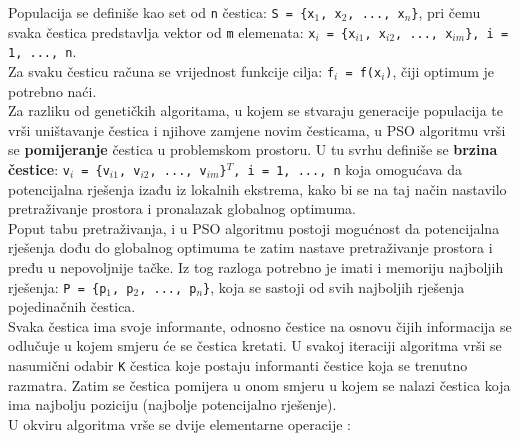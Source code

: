 \documentclass[12pt, a4paper]{article}
\begin{document}
Populacija se definiše kao set od \texttt{n} čestica: \texttt{S = \{x$_1$, x$_2$, ..., x$_n$\}}, pri čemu svaka čestica predstavlja vektor od \texttt{m} elemenata: \texttt{x$_i$ = \{x$_{i1}$, x$_{i2}$, ..., x$_{im}$\}, i = 1, ..., n}.\\

Za svaku česticu računa se vrijednost funkcije cilja: \texttt{f$_i$ = f(x$_i$)}, čiji optimum je potrebno naći.\\

Za razliku od genetičkih algoritama, u kojem se stvaraju generacije populacija te vrši uništavanje čestica i njihove zamjene novim česticama, u PSO algoritmu vrši se \textbf{pomijeranje} čestica u problemskom prostoru. U tu svrhu definiše se \textbf{brzina čestice}: \texttt{v$_i$ = \{v$_{i1}$, v$_{i2}$, ..., v$_{im}$\}$^T$, i = 1, ..., n} koja omogućava da potencijalna rješenja izađu iz lokalnih ekstrema, kako bi se na taj način nastavilo pretraživanje prostora i pronalazak globalnog optimuma. \cite{pso} \\

Poput tabu pretraživanja, i u PSO algoritmu postoji mogućnost da potencijalna rješenja dođu do globalnog optimuma te zatim nastave pretraživanje prostora i pređu u nepovoljnije tačke. Iz tog razloga potrebno je imati i memoriju najboljih rješenja: \texttt{P = \{p$_1$, p$_2$, ..., p$_n$\}}, koja se sastoji od svih najboljih rješenja pojedinačnih čestica. \\

Svaka čestica ima svoje informante, odnosno čestice na osnovu čijih informacija se odlučuje u kojem smjeru će se čestica kretati. U svakoj iteraciji algoritma vrši se nasumični odabir \texttt{K} čestica koje postaju informanti čestice koja se trenutno razmatra. Zatim se čestica pomijera u onom smjeru u kojem se nalazi čestica koja ima najbolju poziciju (najbolje potencijalno rješenje). \\

U okviru algoritma vrše se dvije elementarne operacije \cite{pso}:
\end{document}

